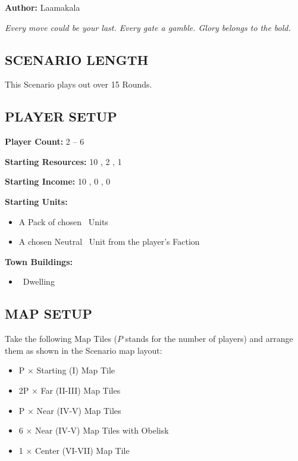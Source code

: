 
\begin{multicols*}{2}

\textbf{Author:} Laamakala

\textit{Every move could be your last. Every gate a gamble. Glory belongs to the bold.}

\subsection*{\MakeUppercase{Scenario Length}}
This Scenario plays out over 15 Rounds.

\subsection*{\MakeUppercase{Player Setup}}
\textbf{Player Count:} 2 -- 6

\textbf{Starting Resources:} 10 , 2 , 1 

\textbf{Starting Income:} 10 , 0 , 0 

\textbf{Starting Units:}

\begin{itemize}
  \item A Pack of chosen \bronze\ Units
  \item A chosen Neutral \bronze\ Unit from the player's Faction
\end{itemize}

\textbf{Town Buildings:}
\begin{itemize}
  \item \bronze\ Dwelling
\end{itemize}

\subsection*{\MakeUppercase{Map Setup}}
Take the following Map Tiles ($P$ stands for the number of players) and arrange them as shown in the Scenario map layout:

\begin{itemize}
  \item P × Starting (I) Map Tile
  \item 2P × Far (II-III) Map Tiles
  \item P × Near (IV-V) Map Tiles
  \item 6 × Near (IV-V) Map Tiles with Obelisk
  \item 1 × Center (VI-VII) Map Tile
\end{itemize}


\end{multicols*}
